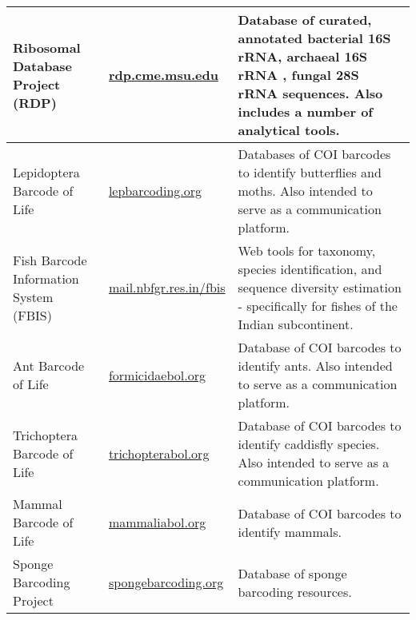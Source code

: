 \documentclass[letterpaper,10pt,hidelinks]{article}
\begin{document}
\begin{table}[h]
\begin{tabular}{p{4cm} p{4cm} p{7cm}}
		\midrule
		{Ribosomal Database Project (RDP)} & {\url{rdp.cme.msu.edu}} & {Database of curated, annotated bacterial 
		16S rRNA, archaeal 16S rRNA , fungal 28S rRNA sequences. Also includes a number of analytical tools.} \\
		\midrule
		{Lepidoptera Barcode of Life} & {\url{lepbarcoding.org}} & {Databases of COI barcodes to identify butterflies 
		and moths. Also intended to serve as a communication platform.} \\
		\midrule
		{Fish Barcode Information System (FBIS)} & {\url{mail.nbfgr.res.in/fbis}} & {Web tools for taxonomy, species 
		identification, and sequence diversity estimation - specifically for fishes of the Indian subcontinent.} \\ 
		\midrule
		{Ant Barcode of Life} & {\url{formicidaebol.org}} & {Database of COI barcodes to identify ants. Also intended 
		to serve as a communication platform.} \\
		\midrule
		{Trichoptera Barcode of Life} & {\url{trichopterabol.org}} & {Database of COI barcodes to identify caddisfly 
		species. Also intended to serve as a communication platform.}
		\\ 
		\midrule
		{Mammal Barcode of Life} & {\url{mammaliabol.org}} & {Database of COI barcodes to identify mammals.} \\
		\midrule
		{Sponge Barcoding Project} & {\url{spongebarcoding.org}} & {Database of sponge barcoding resources.} \\
		\bottomrule
	\end{tabular}
\end{table}

		
\end{document}
